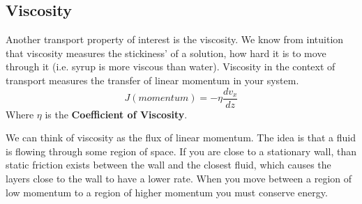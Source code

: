 \documentclass{article}
\newcommand{\be}{\begin{equation}}
\newcommand{\ee}{\end{equation}}
\begin{document}
\subsection*{Viscosity}
Another transport property of interest is the viscosity. 
We know from intuition that viscosity measures the stickiness' of a solution, how hard it is to move through it (i.e. syrup is more viscous than water). 
Viscosity in the context of transport measures the transfer of linear momentum in your system. 
\be
J(momentum) = -\eta \frac{d v_x}{dz}
\ee
Where $\eta$ is the \textbf{Coefficient of Viscosity}. 

We can think of viscosity as the flux of linear momentum. 
The idea is that a fluid is flowing through some region of space.
If you are close to a stationary wall, than static friction exists between the wall and the closest fluid, which causes the layers close to the wall to have a lower rate. 
When you move between a region of low momentum to a region of higher momentum you must conserve energy.
\end{document}
